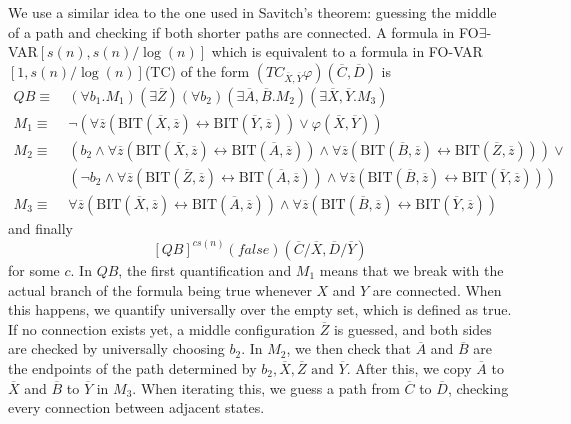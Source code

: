 We use a similar idea to the one used in Savitch's theorem: guessing the middle of a path and checking if both shorter paths are connected.
A formula in FO$\exists$-VAR$[s(n), s(n)/\log(n)]$ which is equivalent to a formula in FO-VAR$[1, s(n)/\log(n)]$(TC) of the form $\left( TC_{\overline{X}, \overline{Y}}\varphi \right)(\overline{C}, \overline{D})$ is
\[
    \begin{aligned}
        QB \equiv~& (\forall b_{1}.M_{1})(\exists\overline{Z}) (\forall b_{2})(\exists \overline{A}, \overline{B}.M_{2})(\exists\overline{X}, \overline{Y}.M_{3}) \\
        M_{1} \equiv~& \neg(\forall \overline{z} (\text{BIT}(\overline{X}, \overline{z}) \leftrightarrow \text{BIT}(\overline{Y}, \overline{z})) \lor \varphi(\overline{X}, \overline{Y})) \\
        M_{2} \equiv~&(b_{2} \land \forall \overline{z} (\text{BIT}(\overline{X}, \overline{z}) \leftrightarrow \text{BIT}(\overline{A}, \overline{z}))\land \forall \overline{z} (\text{BIT}(\overline{B}, \overline{z}) \leftrightarrow \text{BIT}(\overline{Z}, \overline{z}))) \lor \\
        &(\neg b_{2} \land \forall \overline{z} (\text{BIT}(\overline{Z}, \overline{z}) \leftrightarrow \text{BIT}(\overline{A}, \overline{z}))\land \forall \overline{z} (\text{BIT}(\overline{B}, \overline{z}) \leftrightarrow \text{BIT}(\overline{Y}, \overline{z}))) \\
        M_{3} \equiv~&\forall \overline{z} (\text{BIT}(\overline{X}, \overline{z}) \leftrightarrow \text{BIT}(\overline{A}, \overline{z}))\land \forall \overline{z} (\text{BIT}(\overline{B}, \overline{z}) \leftrightarrow \text{BIT}(\overline{Y}, \overline{z}))
    \end{aligned}
\]
and finally
\[
    [QB]^{cs(n)}(false)(\overline{C} / \overline{X}, \overline{D} / \overline{Y})
\]
for some $c$.
In $QB$, the first quantification and $M_1$ means that we break with the actual branch of the formula being true whenever $X$ and $Y$ are connected.
When this happens, we quantify universally over the empty set, which is defined as true.
If no connection exists yet, a middle configuration $\overline{Z}$ is guessed, and both sides are checked by universally choosing $b_2$.
In $M_2$, we then check that $\overline{A}$ and $\overline{B}$ are the endpoints of the path determined by $b_2, \overline{X}, \overline{Z} \text{ and }\overline{Y}$.
After this, we copy $\overline{A}$ to $\overline{X}$ and $\overline{B}$ to $\overline{Y}$ in $M_3$.
When iterating this, we guess a path from $\overline{C}$ to $\overline{D}$, checking every connection between adjacent states.


